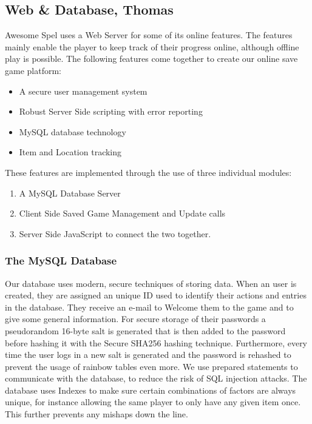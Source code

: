 \documentclass{article}
\begin{document}
\subsection{Web \& Database, Thomas}
Awesome Spel uses a Web Server for some of its online features. The features mainly enable the player to keep track of their progress online, although offline play is possible. The following features come together to create our online save game platform:
\begin{itemize}
\item A secure user management system
\item Robust Server Side scripting with error reporting
\item MySQL database technology
\item Item and Location tracking
\end{itemize}
These features are implemented through the use of three individual modules:
\begin{enumerate}
\item A MySQL Database Server
\item Client Side Saved Game Management and Update calls
\item Server Side JavaScript to connect the two together.
\end{enumerate}
\subsubsection{The MySQL Database}
Our database uses modern, secure techniques of storing data. When an user is created, they are assigned an unique ID used to identify their actions and entries in the database. They receive an e-mail to Welcome them to the game and to give some general information. For secure storage of their passwords a pseudorandom 16-byte salt is generated that is then added to the password before hashing it with the Secure SHA256 hashing technique. Furthermore, every time the user logs in a new salt is generated and the password is rehashed to prevent the usage of rainbow tables even more. We use prepared statements to communicate with the database, to reduce the risk of SQL injection attacks. The database uses Indexes to make sure certain combinations of factors are always unique, for instance allowing the same player to only have any given item once. This further prevents any mishaps down the line.
\end{document}
